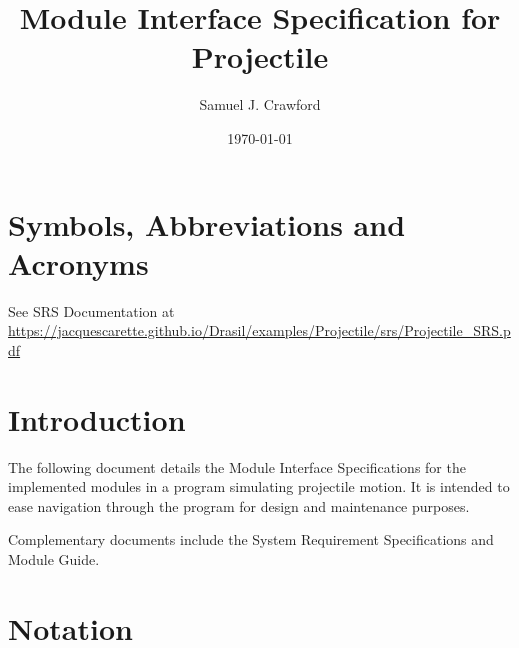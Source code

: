 \documentclass[12pt, titlepage]{article}
\newcommand{\authornote}[3]{\textcolor{#1}{[#3 ---#2]}}
\newcommand{\authornote}[3]{}
\newcommand{\sam}[1]{\authornote{magenta}{SC}{#1}}
\begin{document}
\title{Module Interface Specification for Projectile}

\author{Samuel J. Crawford}

\date{\today}

\maketitle


\newpage

\tableofcontents

\newpage

\section{Symbols, Abbreviations and Acronyms}

See SRS Documentation at \url{https://jacquescarette.github.io/Drasil/examples/Projectile/srs/Projectile_SRS.pdf}


\section{Introduction}

The following document details the Module Interface Specifications for the
implemented modules in a program simulating projectile motion. It is intended to 
ease navigation through the program for design and maintenance purposes.

Complementary documents include the System Requirement Specifications
and Module Guide.


\section{Notation}
\end{document}
